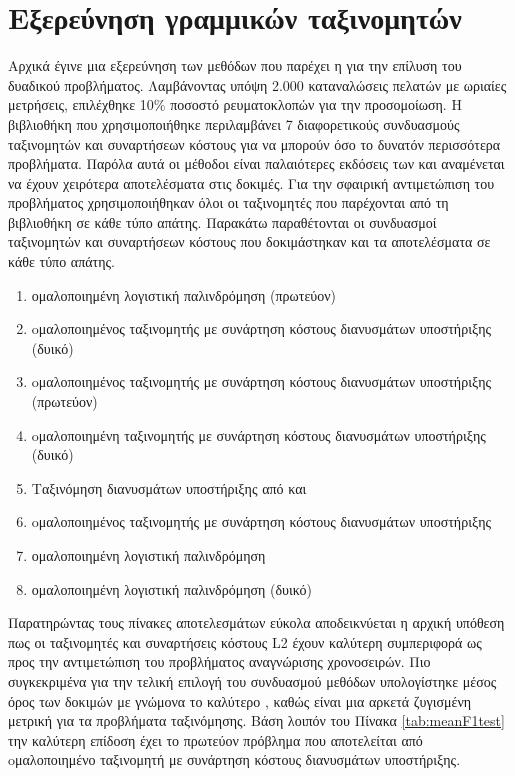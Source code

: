 \section{Εξερεύνηση γραμμικών ταξινομητών}
Αρχικά έγινε μια εξερεύνηση των μεθόδων που παρέχει η  για την επίλυση του δυαδικού προβλήματος. Λαμβάνοντας υπόψη 2.000 καταναλώσεις πελατών με ωριαίες μετρήσεις, επιλέχθηκε 10\% ποσοστό ρευματοκλοπών για την προσομοίωση. Η βιβλιοθήκη που χρησιμοποιήθηκε περιλαμβάνει 7 διαφορετικούς συνδυασμούς ταξινομητών και συναρτήσεων κόστους για να μπορούν όσο το δυνατόν περισσότερα προβλήματα. Παρόλα αυτά οι μέθοδοι  είναι παλαιότερες εκδόσεις των  και αναμένεται να έχουν χειρότερα αποτελέσματα στις δοκιμές. Για την σφαιρική αντιμετώπιση του προβλήματος χρησιμοποιήθηκαν όλοι οι ταξινομητές που παρέχονται από τη βιβλιοθήκη σε κάθε τύπο απάτης. Παρακάτω παραθέτονται οι συνδυασμοί ταξινομητών και συναρτήσεων κόστους που δοκιμάστηκαν και τα αποτελέσματα σε κάθε τύπο απάτης.
\begin{enumerate}
\item {} ομαλοποιημένη λογιστική παλινδρόμηση (πρωτεύον)
\item {} oμαλοποιημένος ταξινομητής με  συνάρτηση κόστους διανυσμάτων υποστήριξης (δυικό)
\item {} oμαλοποιημένος ταξινομητής με  συνάρτηση κόστους διανυσμάτων υποστήριξης (πρωτεύον)
\item {} oμαλοποιημένη ταξινομητής με  συνάρτηση κόστους διανυσμάτων υποστήριξης (δυικό)
\item Ταξινόμηση διανυσμάτων υποστήριξης από  και 
\item {} oμαλοποιημένος ταξινομητής με  συνάρτηση κόστους διανυσμάτων υποστήριξης
\item {} ομαλοποιημένη λογιστική παλινδρόμηση
\item {} ομαλοποιημένη λογιστική παλινδρόμηση (δυικό)
\end{enumerate}
Παρατηρώντας τους πίνακες αποτελεσμάτων εύκολα αποδεικνύεται η αρχική υπόθεση πως οι ταξινομητές και συναρτήσεις κόστους L2 έχουν καλύτερη συμπεριφορά ως προς την αντιμετώπιση του προβλήματος αναγνώρισης χρονοσειρών.  Πιο συγκεκριμένα για την τελική επιλογή του συνδυασμού μεθόδων υπολογίστηκε μέσος όρος των δοκιμών με γνώμονα το καλύτερο , καθώς είναι μια αρκετά ζυγισμένη μετρική για τα προβλήματα ταξινόμησης. Βάση λοιπόν του Πίνακα \ref{tab:meanF1test} την καλύτερη επίδοση έχει το πρωτεύον πρόβλημα που αποτελείται από  oμαλοποιημένο ταξινομητή με  συνάρτηση κόστους διανυσμάτων υποστήριξης.

